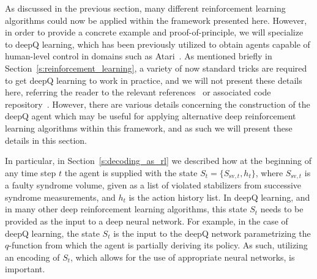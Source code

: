 \documentclass[twocolumn,preprintnumbers,amsmath,amssymb,notitlepage,nofootinbib,longbibliography,superscriptaddress,aps,pra,10pt]{revtex4-1}
\begin{document}
	As discussed in the previous section, many different reinforcement learning algorithms could now be applied within the framework presented here.
	However, in order to provide a concrete example and proof-of-principle, we will specialize to deepQ learning, which has been previously utilized to obtain agents capable of human-level control in domains such as Atari~\cite{RLMnih15}.
	As mentioned briefly in Section~\ref{s:reinforcement_learning}, a variety of now standard tricks are required to get deepQ learning to work in practice, and we will not present these details here, referring the reader to the relevant references~\cite{RLMnih15,RLvan2016deep,RLschaul2015prioritized,RLwang2015dueling} or associated code repository~\cite{DeepQDecoding}.
	However, there are various details concerning the construction of the deepQ agent which may be useful for applying alternative deep reinforcement learning algorithms within this framework, and as such we will present these details in this section.

	In particular, in Section~\ref{s:decoding_as_rl} we described how at the beginning of any time step $t$ the agent is supplied with the state $S_{t}=\{S_{\mathrm{sv},{t}},h_{t}\}$, where $S_{\mathrm{sv},{t}}$ is a faulty syndrome volume, given as a list of violated stabilizers from successive syndrome measurements, and $h_{t}$ is the action history list.
	In deepQ learning, and in many other deep reinforcement learning algorithms, this state $S_t$ needs to be provided as the input to a deep neural network.
	For example, in the case of deepQ learning, the state $S_t$ is the input to the deepQ network parametrizing the $q$-function from which the agent is partially deriving its policy.
	As such, utilizing an encoding of $S_t$, which allows for the use of appropriate neural networks, is important.
\end{document}
